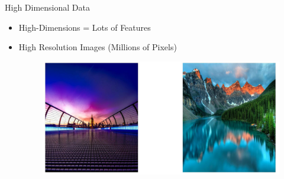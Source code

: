 \documentclass[serif, aspectratio=169]{beamer}
\begin{document}
\begin{frame}{High Dimensional Data}
    \begin{itemize}
        \item High-Dimensions  = Lots of	Features
        \item High Resolution Images (Millions of Pixels)
        \begin{figure}[htpb]
            \begin{center}
                \includegraphics[keepaspectratio, scale=0.4]{pic/highRes.JPG}
            \end{center}
        \end{figure}
    \end{itemize}
\end{frame}
\end{document}
